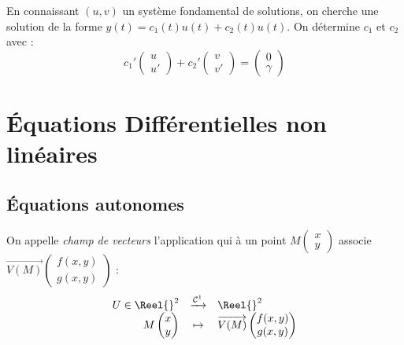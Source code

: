 \documentclass[11pt,a4paper,fleqn,pdftex]{report}
\begin{document}
\begin{itheorem}
    En connaissant $(u,v)$ un système fondamental de solutions, on cherche une solution de la forme $y(t) = c_1(t) u(t) + c_2(t) u(t)$. On détermine $c_1$ et $c_2$ avec :
    \begin{equation}
    c_1'\begin{pmatrix} u \\ u' \end{pmatrix} + c_2'\begin{pmatrix} v \\ v' \end{pmatrix} = \begin{pmatrix} 0 \\ \gamma \end{pmatrix}
    \end{equation}
\end{itheorem}
\chapter{Équations Différentielles non linéaires}
\section{Équations autonomes}
\begin{dfn}
On appelle \emph{champ de vecteurs} l'application qui à un point $M \left( \begin{matrix} x\\ y \end{matrix} \right)$ associe $\overrightarrow{V(M)} \left( \begin{matrix} f(x,y) \\ g(x,y) \end{matrix} \right)$ : 
\[
\begin{array}{r c l}
U\in \Reel{}^2 &\xrightarrow{\mathcal{C}^1} &\Reel{}^2\\
M\begin{pmatrix} x \\ y \end{pmatrix} & \mapsto &\overrightarrow{V(M)} \left( \begin{matrix} f(x,y) \\ g(x,y) \end{matrix} \right)
\end{array}
\]
\end{dfn}
\end{document}
